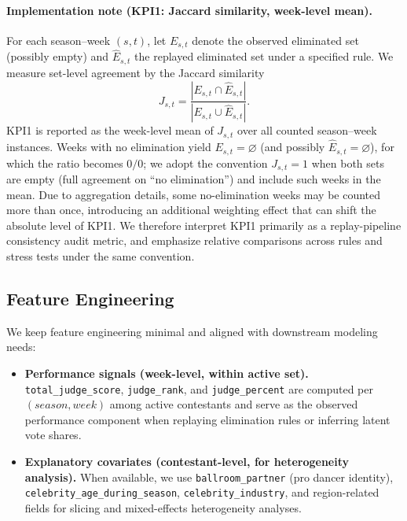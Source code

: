 \paragraph{Implementation note (KPI1: Jaccard similarity, week-level mean).}
For each season--week $(s,t)$, let $E_{s,t}$ denote the observed eliminated set (possibly empty) and
$\hat{E}_{s,t}$ the replayed eliminated set under a specified rule. We measure set-level agreement by
the Jaccard similarity
\[
J_{s,t}=\frac{|E_{s,t}\cap \hat{E}_{s,t}|}{|E_{s,t}\cup \hat{E}_{s,t}|}.
\]
KPI1 is reported as the week-level mean of $J_{s,t}$ over all counted season--week instances.
Weeks with no elimination yield $E_{s,t}=\varnothing$ (and possibly $\hat{E}_{s,t}=\varnothing$), for which
the ratio becomes $0/0$; we adopt the convention $J_{s,t}=1$ when both sets are empty (full agreement on
``no elimination'') and include such weeks in the mean.
Due to aggregation details, some no-elimination weeks may be counted more than once, introducing an
additional weighting effect that can shift the absolute level of KPI1. We therefore interpret KPI1 primarily as
a replay-pipeline consistency audit metric, and emphasize relative comparisons across rules and stress tests
under the same convention.


\subsection{Feature Engineering}
\label{subsec:feature_engineering}

We keep feature engineering minimal and aligned with downstream modeling needs:

\begin{itemize}
  \item \textbf{Performance signals (week-level, within active set).}
  \texttt{total\_judge\_score}, \texttt{judge\_rank}, and \texttt{judge\_percent} are computed per $(season, week)$ among active contestants
  and serve as the observed performance component when replaying elimination rules or inferring latent vote shares.

  \item \textbf{Explanatory covariates (contestant-level, for heterogeneity analysis).}
  When available, we use \texttt{ballroom\_partner} (pro dancer identity), \texttt{celebrity\_age\_during\_season},
  \texttt{celebrity\_industry}, and region-related fields for slicing and mixed-effects heterogeneity analyses.
\end{itemize}


